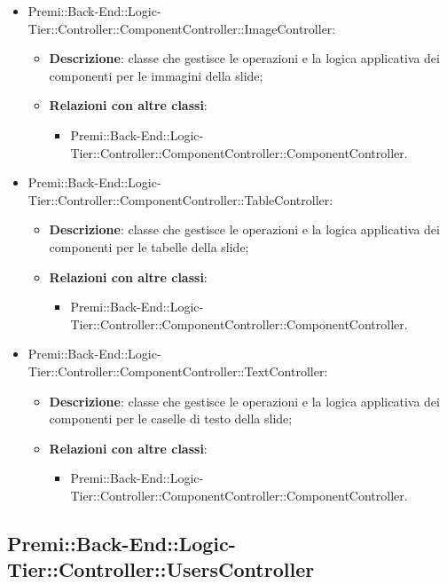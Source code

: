 \begin{itemize}
		\item Premi::Back-End::Logic-Tier::Controller::ComponentController::ImageController:
		\begin{itemize}
			\item \textbf{Descrizione}: classe che gestisce le operazioni e la logica applicativa dei componenti per le immagini della slide;
			\item \textbf{Relazioni con altre classi}:
			\begin{itemize}
				\item Premi::Back-End::Logic-Tier::Controller::ComponentController::ComponentController.
			\end{itemize}
		\end{itemize}
		
		\item Premi::Back-End::Logic-Tier::Controller::ComponentController::TableController:
		\begin{itemize}
			\item \textbf{Descrizione}: classe che gestisce le operazioni e la logica applicativa dei componenti per le tabelle della slide;
			\item \textbf{Relazioni con altre classi}:
			\begin{itemize}
				\item Premi::Back-End::Logic-Tier::Controller::ComponentController::ComponentController.
			\end{itemize}
		\end{itemize}
		
		\item Premi::Back-End::Logic-Tier::Controller::ComponentController::TextController:
		\begin{itemize}
			\item \textbf{Descrizione}: classe che gestisce le operazioni e la logica applicativa dei componenti per le caselle di testo della slide;
			\item \textbf{Relazioni con altre classi}:
			\begin{itemize}
				\item Premi::Back-End::Logic-Tier::Controller::ComponentController::ComponentController.
			\end{itemize}
		\end{itemize}
	\end{itemize}
	
	
\subsection{Premi::Back-End::Logic-Tier::Controller::UsersController}
